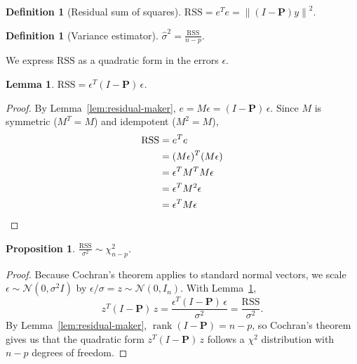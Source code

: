 \documentclass[11pt]{article}
\newtheorem{lemma}[theorem]{Lemma}
\newtheorem{proposition}[theorem]{Proposition}
\theoremstyle{definition}
\newtheorem{definition}[theorem]{Definition}
\begin{document}
\begin{definition}[Residual sum of squares]
    $\mathrm{RSS} = e^T e = \left\| (I - \mathbf{P}) y \right\|^2$.
\end{definition}

\begin{definition}[Variance estimator]
    $\displaystyle \widehat{\sigma}^2 = \frac{\mathrm{RSS}}{n - p}$.
\end{definition}

We express $\mathrm{RSS}$ as a quadratic form in the errors $\epsilon$.

\begin{lemma}\label{lem:rss-quadform}
    $\mathrm{RSS} = \epsilon^T (I - \mathbf{P})\, \epsilon$.
\end{lemma}

\begin{proof}
    By Lemma~\ref{lem:residual-maker}, $e = M\epsilon = (I - \mathbf{P})\,\epsilon$. Since $M$ is symmetric ($M^T = M$) and idempotent
    ($M^2 = M$), 
    \begin{align*}
        \mathrm{RSS} &= e^T e \\
                     &= (M\epsilon)^T (M\epsilon) \\
                     &= \epsilon^T M^T M \epsilon \\
                     &= \epsilon^T M^2 \epsilon \\
                     &= \epsilon^T M \epsilon \qedhere
    \end{align*}
\end{proof}

\begin{proposition}\label{prop:rss-chisq}
    $\displaystyle \frac{\mathrm{RSS}}{\sigma^2} \sim \chi^2_{n-p}$.
\end{proposition}

\begin{proof}
    Because Cochran's theorem applies to standard normal vectors, we scale 
    $\epsilon \sim \mathcal{N}(0, \sigma^2 I)$ by $\epsilon / \sigma = z \sim \mathcal{N}(0, I_n)$.
    With Lemma~\ref{lem:rss-quadform},
    $$
        z^T (I - \mathbf{P})\, z
        = \frac{\epsilon^T (I - \mathbf{P})\, \epsilon}{\sigma^2}
        = \frac{\mathrm{RSS}}{\sigma^2}.
    $$
    By Lemma~\ref{lem:residual-maker}, $\operatorname{rank}(I - \mathbf{P}) = n - p$, so 
    Cochran's theorem gives us that the quadratic form $z^T (I - \mathbf{P})\, z$
    follows a $\chi^2$ distribution with $n - p$ degrees of freedom.
\end{proof}
\end{document}
